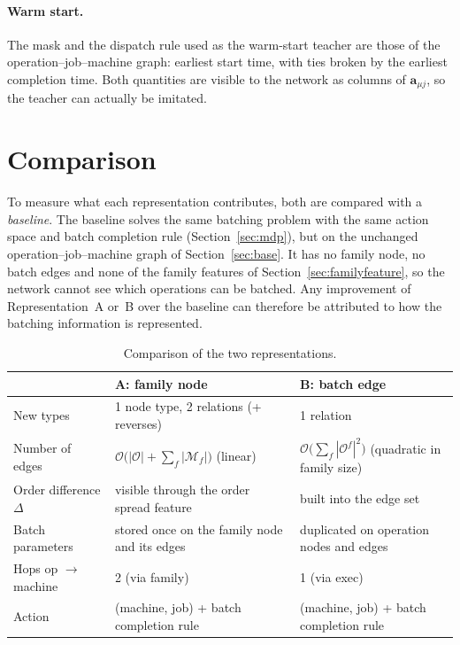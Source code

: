 \documentclass[11pt,a4paper]{article}
\newcommand{\Oset}{\mathcal{O}}
\newcommand{\Mset}{\mathcal{M}}
\begin{document}
\paragraph{Warm start.} The mask and the dispatch rule used as the warm-start
teacher are those of the operation--job--machine graph: earliest start time, with
ties broken by the earliest completion time. Both quantities are visible to the
network as columns of $\mathbf{a}_{\mu j}$, so the teacher can actually be imitated.

\section{Comparison}
\label{sec:comparison}

To measure what each representation contributes, both are compared with a
\emph{baseline}. The baseline solves the same batching problem with the same
action space and batch completion rule (Section~\ref{sec:mdp}), but on the
unchanged operation--job--machine graph of Section~\ref{sec:base}. It has no
family node, no batch edges and none of the family features of
Section~\ref{sec:familyfeature}, so the network cannot see which operations can
be batched. Any improvement of Representation~A or~B over the baseline can
therefore be attributed to how the batching information is represented.

\begin{table}[h]
\centering
\caption{Comparison of the two representations.}
\label{tab:comparison}
\begin{tabular}{l p{5.2cm} p{5.2cm}}
\toprule
 & A: family node & B: batch edge \\
\midrule
New types        & 1 node type, 2 relations (+ reverses) & 1 relation \\
Number of edges  & $\mathcal{O}\bigl(|\Oset|+\sum_f|\Mset_f|\bigr)$ (linear) & $\mathcal{O}\bigl(\sum_f|\Oset^f|^2\bigr)$ (quadratic in family size) \\
Order difference $\Delta$ & visible through the order spread feature & built into the edge set \\
Batch parameters & stored once on the family node and its edges & duplicated on operation nodes and edges \\
Hops op $\to$ machine & 2 (via family) & 1 (via \textsf{exec}) \\
Action & (machine, job) + batch completion rule & (machine, job) + batch completion rule \\
\bottomrule
\end{tabular}
\end{table}
\end{document}
